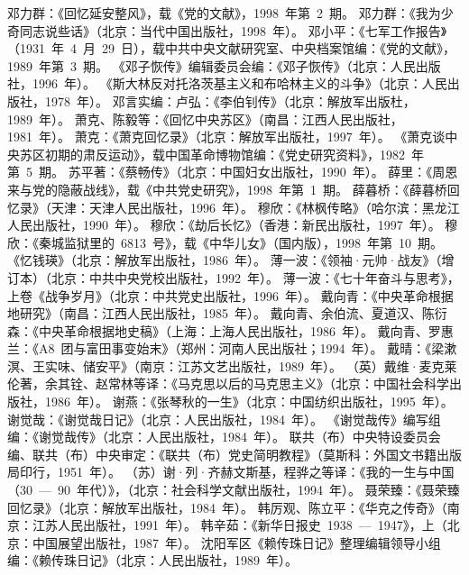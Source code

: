 \begin{thebibliography}{999}
\bibitem{}邓力群：《回忆延安整风》，载《党的文献》，1998~年第~2~期。
\bibitem{}邓力群：《我为少奇同志说些话》（北京：当代中国出版社，1998~年）。
\bibitem{}邓小平：《七军工作报告》（1931~年~4~月~29~日），载中共中央文献研究室、中央档案馆编：《党的文献》，1989~年第~3~期。
\bibitem{}《邓子恢传》编辑委员会编：《邓子恢传》（北京：人民出版社，1996~年）。
\bibitem{}《斯大林反对托洛茨基主义和布哈林主义的斗争》（北京：人民出版社，1978~年）。
\bibitem{}邓言实编：卢弘：《李伯钊传》（北京：解放军出版杜，1989~年）。
\bibitem{}萧克、陈毅等：《回忆中央苏区》（南昌：江西人民出版社，1981~年）。
\bibitem{}萧克：《萧克回忆录》（北京：解放军出版社，1997~年）。
\bibitem{}《萧克谈中央苏区初期的肃反运动》，载中国革命博物馆编：《党史研究资料》，1982~年第~5~期。
\bibitem{}苏平著：《蔡畅传》（北京：中国妇女出版社，1990~年）。
\bibitem{}薛里：《周恩来与党的隐蔽战线》，载《中共党史研究》，1998~年第~1~期。
\bibitem{}薛暮桥：《薛暮桥回忆录》（天津：天津人民出版社，1996~年）。
\bibitem{}穆欣：《林枫传略》（哈尔滨：黑龙江人民出版社，1990~年）。
\bibitem{}穆欣：《劫后长忆》（香港：新民出版社，1997~年）。
\bibitem{}穆欣：《秦城监狱里的~6813~号》，载《中华儿女》（国内版），1998~年第~10~期。
\bibitem{}《忆钱瑛》（北京：解放军出版社，1986~年）。
\bibitem{}薄一波：《领袖·元帅·战友》（增订本）（北京：中共中央党校出版社，1992~年）。
\bibitem{}薄一波：《七十年奋斗与思考》，上卷《战争岁月》（北京：中共党史出版社，1996~年）。
\bibitem{}戴向青：《中央革命根据地研究》（南昌：江西人民出版社，1985~年）。
\bibitem{}戴向青、余伯流、夏道汉、陈衍森：《中央革命根据地史稿》（上海：上海人民出版社，1986~年）。
\bibitem{}戴向青、罗惠兰：《A8~团与富田事变始末》（郑州：河南人民出版社；1994~年）。
\bibitem{}戴晴：《梁漱溟、王实味、储安平》（南京：江苏文艺出版社，1989~年）。
\bibitem{}（英）戴维·麦克莱伦著，余其铨、赵常林等译：《马克思以后的马克思主义》（北京：中国社会科学出版社，1986~年）。
\bibitem{}谢燕：《张琴秋的一生》（北京：中国纺织出版社，1995~年）。
\bibitem{}谢觉哉：《谢觉哉日记》（北京：人民出版社，1984~年）。
\bibitem{}《谢觉哉传》编写组编：《谢觉哉传》（北京：人民出版社，1984~年）。
\bibitem{}联共（布）中央特设委员会编、联共（布）中央审定：《联共（布）党史简明教程》（莫斯科：外国文书籍出版局印行，1951~年）。
\bibitem{}（苏）谢·列·齐赫文斯基，程骅之等译：《我的一生与中国（30~—~90~年代）》，（北京：社会科学文献出版社，1994~年）。
\bibitem{}聂荣臻：《聂荣臻回忆录》（北京：解放军出版社，1984~年）。
\bibitem{}韩厉观、陈立平：《华克之传奇》（南京：江苏人民出版社，1991~年）。
\bibitem{}韩辛茹：《新华日报史~1938~—~1947》，上（北京：中国展望出版社，1987~年）。
\bibitem{}沈阳军区《赖传珠日记》整理编辑领导小组编：《赖传珠日记》（北京：人民出版社，1989~年）。

\end{thebibliography}
